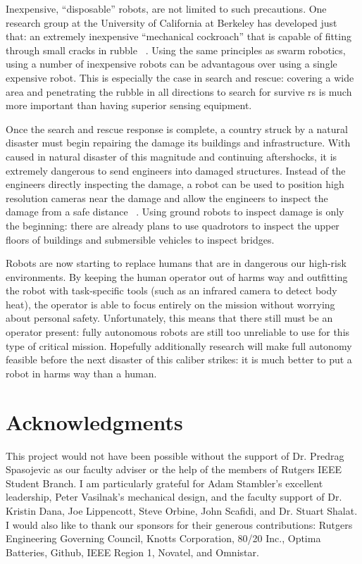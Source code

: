 \documentclass[twocolumn,11pt]{article}
\begin{document}
Inexpensive, ``disposable'' robots, are not limited to such precautions. One
research group at the University of California at Berkeley has developed just
that: an extremely inexpensive ``mechanical cockroach'' that is capable of
fitting through small cracks in rubble ~\cite{cockroach}. Using the same
principles as swarm robotics, using a number of inexpensive robots can be
advantagous over using a single expensive robot. This is especially the case in
search and rescue: covering a wide area and penetrating the rubble in all
directions to search for survive rs is much more important than having superior
sensing equipment.

Once the search and rescue response is complete, a country struck by a natural
disaster must begin repairing the damage its buildings and infrastructure. With
caused in natural disaster of this magnitude and continuing aftershocks, it is
extremely dangerous to send engineers into damaged structures. Instead of the
engineers directly inspecting the damage, a robot can be used to position high
resolution cameras near the damage and allow the engineers to inspect the
damage from a safe distance ~\cite{gym}. Using ground robots to inspect damage
is only the beginning: there are already plans to use quadrotors to inspect
the upper floors of buildings and submersible vehicles to inspect bridges.

Robots are now starting to replace humans that are in dangerous our high-risk
environments. By keeping the human operator out of harms way and outfitting the
robot with task-specific tools (such as an infrared camera to detect body
heat), the operator is able to focus entirely on the mission without worrying
about personal safety. Unfortunately, this means that there still must be an
operator present: fully autonomous robots are still too unreliable to use for
this type of critical mission. Hopefully additionally research will make full
autonomy feasible before the next disaster of this caliber strikes: it is much
better to put a robot in harms way than a human.

\section{Acknowledgments}
This project would not have been possible without the support of Dr. Predrag
Spasojevic as our faculty adviser or the help of the members of Rutgers IEEE
Student Branch. I am particularly grateful for Adam Stambler's excellent
leadership, Peter Vasilnak's mechanical design, and the faculty support of Dr.
Kristin Dana, Joe Lippencott, Steve Orbine, John Scafidi, and Dr. Stuart
Shalat. I would also like to thank our sponsors for their generous
contributions: Rutgers Engineering Governing Council, Knotts Corporation, 80/20
Inc., Optima Batteries, Github, IEEE Region 1, Novatel, and Omnistar.

{\footnotesize
{}

}
\end{document}
